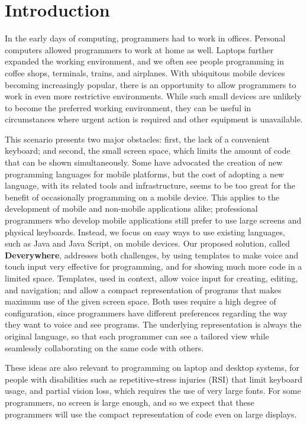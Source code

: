 \chapter{Introduction}
In the early days of computing, programmers had to work in offices. Personal computers allowed programmers to work at home as well. Laptops further expanded the working environment, and we often see people programming in coffee shops, terminals, trains, and airplanes. With ubiquitous mobile devices becoming increasingly popular, there is an opportunity to allow programmers to work in even more restrictive environments. While such small devices are unlikely to become the preferred working environment, they can be useful in circumstances where urgent action is required and other equipment is unavailable.

This scenario presents two major obstacles: first, the lack of a convenient keyboard; and second, the small screen space, which limits the amount of code that can be shown simultaneously. Some have advocated the creation of new programming languages for mobile platforms, but the cost of adopting a new language, with its related tools and infrastructure, seems to be too great for the benefit of occasionally programming on a mobile device. This applies to the development of mobile and non-mobile applications alike; professional programmers who develop mobile applications still prefer to use large screens and physical keyboards. Instead, we focus on easy ways to use existing languages, such as Java and Java Script, on mobile devices. Our proposed solution, called \textbf{Deverywhere}, addresses both challenges, by using templates to make voice and touch input very effective for programming, and for showing much more code in a limited space. Templates, used in context, allow voice input for creating, editing, and navigation; and allow a compact representation of programs that makes maximum use of the given screen space. Both uses require a high degree of configuration, since programmers have different preferences regarding the way they want to voice and see programs. The underlying representation is always the original language, so that each programmer can see a tailored view while seamlessly collaborating on the same code with others.

These ideas are also relevant to programming on laptop and desktop systems, for people with disabilities such as repetitive-stress injuries (RSI) that limit keyboard usage, and partial vision loss, which requires the use of very large fonts. For some programmers, no screen is large enough, and so we expect that these programmers will use the compact representation of code even on large displays.
